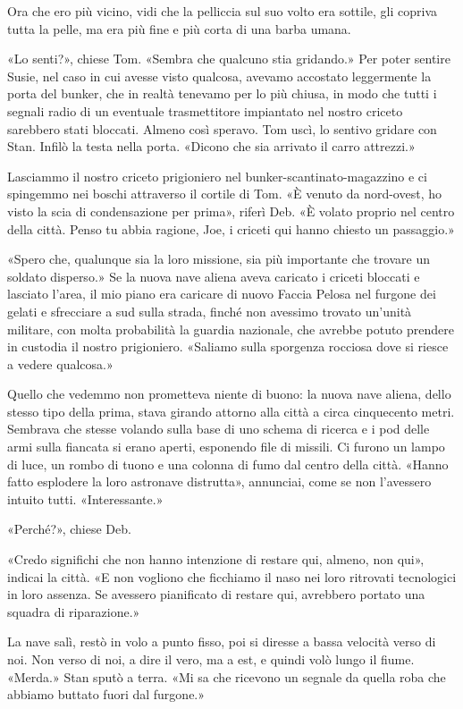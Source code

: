 Ora che ero più vicino, vidi che la pelliccia sul suo volto era sottile,
gli copriva tutta la pelle, ma era più fine e più corta di una barba
umana.

«Lo senti?», chiese Tom. «Sembra che qualcuno stia gridando.» Per poter
sentire Susie, nel caso in cui avesse visto qualcosa, avevamo accostato
leggermente la porta del bunker, che in realtà tenevamo per lo più
chiusa, in modo che tutti i segnali radio di un eventuale trasmettitore
impiantato nel nostro criceto sarebbero stati bloccati. Almeno così
speravo. Tom uscì, lo sentivo gridare con Stan. Infilò la testa nella
porta. «Dicono che sia arrivato il carro attrezzi.»

Lasciammo il nostro criceto prigioniero nel bunker-scantinato-magazzino
e ci spingemmo nei boschi attraverso il cortile di Tom. «È venuto da
nord-ovest, ho visto la scia di condensazione per prima», riferì Deb. «È
volato proprio nel centro della città. Penso tu abbia ragione, Joe, i
criceti qui hanno chiesto un passaggio.»

«Spero che, qualunque sia la loro missione, sia più importante che
trovare un soldato disperso.» Se la nuova nave aliena aveva caricato i
criceti bloccati e lasciato l'area, il mio piano era caricare di nuovo
Faccia Pelosa nel furgone dei gelati e sfrecciare a sud sulla strada,
finché non avessimo trovato un'unità militare, con molta probabilità la
guardia nazionale, che avrebbe potuto prendere in custodia il nostro
prigioniero. «Saliamo sulla sporgenza rocciosa dove si riesce a vedere
qualcosa.»

Quello che vedemmo non prometteva niente di buono: la nuova nave aliena,
dello stesso tipo della prima, stava girando attorno alla città a circa
cinquecento metri. Sembrava che stesse volando sulla base di uno schema
di ricerca e i pod delle armi sulla fiancata si erano aperti, esponendo
file di missili. Ci furono un lampo di luce, un rombo di tuono e una
colonna di fumo dal centro della città. «Hanno fatto esplodere la loro
astronave distrutta», annunciai, come se non l'avessero intuito tutti.
«Interessante.»

«Perché?», chiese Deb.

«Credo significhi che non hanno intenzione di restare qui, almeno, non
qui», indicai la città. «E non vogliono che ficchiamo il naso nei loro
ritrovati tecnologici in loro assenza. Se avessero pianificato di
restare qui, avrebbero portato una squadra di riparazione.»

La nave salì, restò in volo a punto fisso, poi si diresse a bassa
velocità verso di noi. Non verso di noi, a dire il vero, ma a est, e
quindi volò lungo il fiume. «Merda.» Stan sputò a terra. «Mi sa che
ricevono un segnale da quella roba che abbiamo buttato fuori dal
furgone.»

